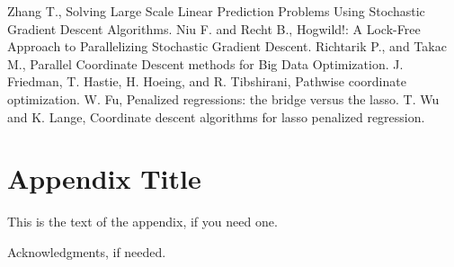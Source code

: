 \documentclass{sigplanconf}
\begin{document}
\begin{thebibliography}{}
\softraggedright

Zhang T., Solving Large Scale Linear Prediction Problems Using Stochastic Gradient Descent Algorithms.
Niu F. and Recht B., Hogwild!: A Lock-Free Approach to Parallelizing Stochastic Gradient Descent.
Richtarik P., and Takac M., Parallel Coordinate Descent methods for Big Data Optimization.
J. Friedman, T. Hastie, H. Hoeing, and R. Tibshirani, Pathwise coordinate optimization.
W. Fu, Penalized regressions: the bridge versus the lasso.
T. Wu and K. Lange, Coordinate descent algorithms for lasso penalized regression.

\end{thebibliography}

\appendix

\section{Appendix Title}

This is the text of the appendix, if you need one.

\acks

Acknowledgments, if needed.
\end{document}
